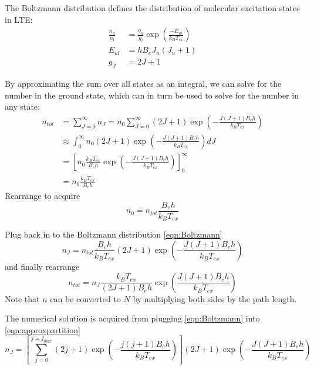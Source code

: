 \documentclass[preprint]{aastex}
\begin{document}
The Boltzmann distribution defines the distribution of molecular excitation states in LTE:
\begin{align}
  \frac{n_u}{n_l} &= \frac{g_u}{g_l} \exp\left(\frac{-E_{ul}}{k_B T_{ex}}\right) \label{eqn:Boltzmann}\\
  E_{ul} &= h B_e J_u(J_u+1) \label{eqn:eul} \\
  g_J &= 2J+1 \label{eqn:gj} 
\end{align}

By approximating the sum over all states as an integral, we can solve for the number in the 
ground state, which can in turn be used to solve for the number in any state:
\begin{align}
  n_{tot} & =        \sum_{J=0}^\infty n_J = n_0 \sum_{J=0}^\infty  (2J+1) \exp\left(-\frac{J(J+1) B_e h}{k_B T_{ex}}\right) \label{eqn:approxpartition}\\
          & \approx  \int_0^\infty  n_0  (2J+1) \exp\left(-\frac{J(J+1) B_e h}{k_B T_{ex}}\right) dJ \label{eqn:approxpartition2}\\
          & =        \left[ n_0 \frac{k_B T_{ex}}{B_e h} \exp\left(-\frac{J(J+1) B_e h}{k_B T_{ex}}\right) \right]^\infty_0 \label{eqn:approxpartition3}\\
          & =        n_0 \frac{k_B T_{ex}}{B_e h} \label{eqn:approxpartition4}
\end{align}
Rearrange to acquire 
\begin{equation}
  n_0 = n_{tot} \frac{B_e h}{k_B T_{ex}} 
\end{equation}

Plug back in to the Boltzmann distribution \eqref{eqn:Boltzmann}
\begin{equation}
  n_J = n_{tot} \frac{B_e h}{k_B T_{ex}} (2J+1) \exp\left(-\frac{J(J+1) B_e h}{k_B T_{ex}}\right)
\end{equation}
and finally rearrange
\begin{equation}
  \label{eqn:partition_final}
  n_{tot} = n_{J} \frac{k_B T_{ex}}{(2J+1)B_e h}  \exp\left(\frac{J(J+1) B_e h}{k_B T_{ex}}\right)
\end{equation}
Note that $n$ can be converted to $N$ by multiplying both sides by the path length.  

The numerical solution is acquired from plugging \eqref{eqn:Boltzmann} into \eqref{eqn:approxpartition}
\begin{equation}
  n_J = \left[ \sum_{j=0}^{j=j_{max}} (2j+1) \exp\left(-\frac{j(j+1) B_e h}{k_B T_{ex}}\right) \right] (2J+1) \exp\left(-\frac{J(J+1) B_e h}{k_B T_{ex}}\right)
\end{equation}
\end{document}
